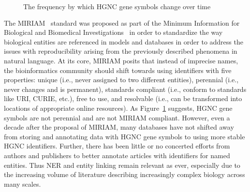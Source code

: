 \begin{figure}
    \captionsetup{format=plain}
    \caption[HGNC Gene Symbol Half Lives]{The frequency by which HGNC gene symbols change over time}
    \label{fig:gene_symbol_half_life}
\end{figure}

The \ac{MIRIAM}~\cite{Laibe2007} standard was proposed as part of the Minimum Information for Biological and Biomedical Investigations~\cite{Taylor2008} in order to standardize the way biological entities are referenced in models and databases in order to address the issues with reproducibility arising from the previously described phenomena in natural language.
At its core, \ac{MIRIAM} posits that instead of imprecise names, the bioinformatics community should shift towards using identifiers with five properties: unique (i.e., never assigned to two different entities), perennial (i.e., never changes and is permanent), standards compliant (i.e., conform to standards like \ac{URI}, \ac{CURIE}, etc.), free to use, and resolvable (i.e., can be transformed into locations of appropriate online resources).
As Figure~\ref{fig:gene_symbol_half_life} suggests, \ac{HGNC} gene symbols are not perennial and are not \ac{MIRIAM} compliant.
However, even a decade after the proposal of \ac{MIRIAM}, many databases have not shifted away from storing and annotating data with \ac{HGNC} gene symbols to using more stable \ac{HGNC} identifiers.
Further, there has been little or no concerted efforts from authors and publishers to better annotate articles with identifiers for named entities.
Thus \ac{NER} and entity linking remain relevant as ever, especially due to the increasing volume of literature describing increasingly complex biology across many scales.


